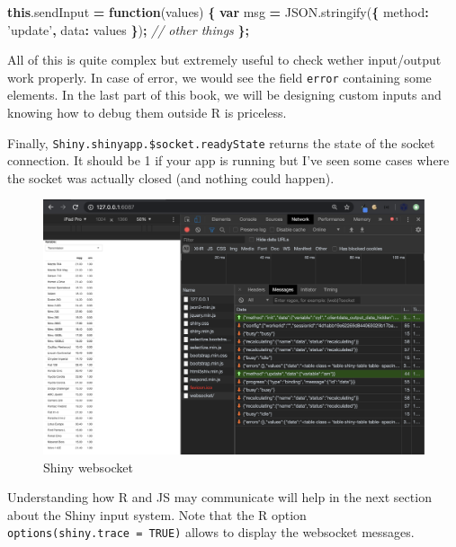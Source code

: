 \documentclass[]{book}
\newenvironment{Shaded}{\begin{snugshade}}{\end{snugshade}}
\newcommand{\AttributeTok}[1]{\textcolor[rgb]{0.77,0.63,0.00}{#1}}
\newcommand{\CommentTok}[1]{\textcolor[rgb]{0.56,0.35,0.01}{\textit{#1}}}
\newcommand{\DataTypeTok}[1]{\textcolor[rgb]{0.13,0.29,0.53}{#1}}
\newcommand{\KeywordTok}[1]{\textcolor[rgb]{0.13,0.29,0.53}{\textbf{#1}}}
\newcommand{\NormalTok}[1]{#1}
\newcommand{\OperatorTok}[1]{\textcolor[rgb]{0.81,0.36,0.00}{\textbf{#1}}}
\newcommand{\StringTok}[1]{\textcolor[rgb]{0.31,0.60,0.02}{#1}}
\newcommand{\VariableTok}[1]{\textcolor[rgb]{0.00,0.00,0.00}{#1}}
\begin{document}
\begin{Shaded}
\begin{Highlighting}[]
\KeywordTok{this}\NormalTok{.}\AttributeTok{sendInput} \OperatorTok{=} \KeywordTok{function}\NormalTok{(values) }\OperatorTok{\{}
  \KeywordTok{var}\NormalTok{ msg }\OperatorTok{=} \VariableTok{JSON}\NormalTok{.}\AttributeTok{stringify}\NormalTok{(}\OperatorTok{\{}
    \DataTypeTok{method}\OperatorTok{:} \StringTok{'update'}\OperatorTok{,}
    \DataTypeTok{data}\OperatorTok{:}\NormalTok{ values}
  \OperatorTok{\}}\NormalTok{)}\OperatorTok{;}
\CommentTok{// other things}
\OperatorTok{\};}
\end{Highlighting}
\end{Shaded}

All of this is quite complex but extremely useful to check wether input/output work properly. In case of error, we would see the field \texttt{error} containing some elements. In the last part of this book, we will be designing custom inputs and knowing how to debug them outside R is priceless.

Finally, \texttt{Shiny.shinyapp.\$socket.readyState} returns the state of the socket connection. It should be 1 if your app is running but I've seen some cases where the socket was actually closed (and nothing could happen).

\begin{figure}
\includegraphics[width=27.69in]{images/survival-kit/shiny-websocket} \caption{Shiny websocket}\label{fig:shiny-websocket}
\end{figure}

Understanding how R and JS may communicate will help in the next section about the Shiny input system. Note that the R option \texttt{options(shiny.trace\ =\ TRUE)} allows to display the websocket messages.
\end{document}
